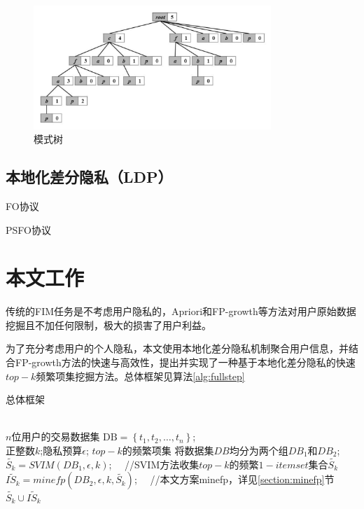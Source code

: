 \documentclass[UTF8]{ctexart}
\begin{document}
  \begin{figure}[h]
    \centering
    \includegraphics[width=0.8\textwidth]{fptree.pdf}
    \caption{模式树}
    \label{fig:fptree}
  \end{figure}

\subsection{本地化差分隐私（LDP）}
  FO协议

  PSFO协议


\section{本文工作}
\label{section:fullstep}
传统的FIM任务是不考虑用户隐私的，Apriori\cite{agrawal1994fast}和FP-growth\cite{han2000mining}等方法对用户原始数据挖掘且不加任何限制，极大的损害了用户利益。

为了充分考虑用户的个人隐私，本文使用本地化差分隐私机制聚合用户信息，并结合FP-growth方法\cite{han2000mining}的快速与高效性，提出并实现了一种基于本地化差分隐私的快速$top-k$频繁项集挖掘方法。总体框架见算法\ref{alg:fullstep}

\begin{algorithm}[htbp]
    \caption{总体框架}
    \label{alg:fullstep}
        \begin{algorithmic}[1]
        \REQUIRE ~~\\
        $n$位用户的交易数据集 $\mathrm{DB}=\left\{t_{1}, t_{2}, \ldots, t_{n}\right\}$;\\
        正整数$k$;隐私预算$\epsilon$;
        \ENSURE $top-k$的频繁项集
        \STATE 将数据集$DB$均分为两个组$D B_{1}$和$D B_{2}$;
        \label{fullstep:group}
			 \STATE $\tilde{S_k} = SVIM(DB_1,\epsilon,k)$; \ \  //SVIM\cite{wang2018locally}方法收集$top-k$的频繁$1-itemset$集合$\tilde{S_k}$
        \label{fullstep:SVIM}
			 \STATE $\tilde{IS_k} = minefp(DB_2,\epsilon,k,\tilde{S_k})$; \ \  //本文方案minefp，详见\ref{section:minefp}节
			 \label{fullstep:minefp}
        \RETURN $\tilde{S_k} \cup \tilde{IS_k}$
        \end{algorithmic}
\end{algorithm}
\end{document}

